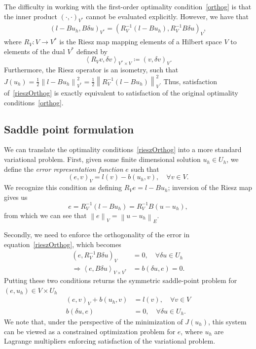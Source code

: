 \documentclass[final,leqno]{siamltex}
\newcommand{\nor}[1]{\left\| #1 \right\|}
\newcommand{\LRp}[1]{\left( #1 \right)}
\newcommand{\LRa}[1]{\left\langle #1 \right\rangle}
\begin{document}
The difficulty in working with the first-order optimality condition~\eqref{orthog} is that the inner product $\LRp{\cdot,\cdot}_{V^*}$ cannot be evaluated explicitly.  However, we have that 
\begin{align}
\left(l-Bu_h,B\delta u\right)_{V^*} = \left(R_V^{-1}(l-Bu_h),R_V^{-1}B\delta u\right)_{V},
\label{rieszOrthog}
\end{align}
where $R_V: V\rightarrow V^*$ is the Riesz map mapping elements of a Hilbert space $V$ to elements of the dual $V^*$ defined by
\[
\LRa{R_Vv,\delta v}_{V^*\times V} \coloneqq \LRp{v,\delta v}_V.
\]
Furthermore, the Riesz operator is an isometry, such that $J(u_h) = \frac{1}{2}\nor{l-Bu_h}^2_{V^*} = \frac{1}{2}\nor{R_V^{-1}(l-Bu_h)}^2_{V}$.  Thus, satisfaction of~\eqref{rieszOrthog} is exactly equivalent to satisfaction of the original optimality conditions~\eqref{orthog}.  

\subsection{Saddle point formulation}
\label{sec:saddlePoint}
We can translate the optimality conditions~\eqref{rieszOrthog} into a more standard variational problem.  First, given some finite dimensional solution $u_h\in U_h$, we define the \textit{error representation function} $e$ such that
\[
\LRp{e,v}_V = l(v)-b(u_h,v), \quad \forall v\in V.
\]
We recognize this condition as defining $R_V e = l-Bu_h$; inversion of the Riesz map gives us 
\[
e = R_V^{-1}\LRp{l-Bu_h} = R_V^{-1}B\LRp{u-u_h},
\]
from which we can see that $\nor{e}_V = \nor{u-u_h}_E$.  

Secondly, we need to enforce the orthogonality of the error in equation~\eqref{rieszOrthog}, which becomes
\begin{align*}
\LRp{e,R_V^{-1}B\delta u}_V &= 0, \quad \forall \delta u \in U_h\\
\Rightarrow \LRa{e,B\delta u}_{V\times V^*} &= b(\delta u, e) = 0.
\end{align*}
Putting these two conditions returns the symmetric saddle-point problem for $\LRp{e,u_h} \in V\times U_h$
\begin{align*}
\LRp{e,v}_V + b(u_h,v) &= l(v), \quad \forall v\in V\\
b(\delta u, e) &= 0, \quad \forall \delta u \in U_h.
\end{align*}
We note that, under the perspective of the minimization of $J(u_h)$, this system can be viewed as a constrained optimization problem for $e$, where $u_h$ are Lagrange multipliers enforcing satisfaction of the variational problem.  
\end{document}

